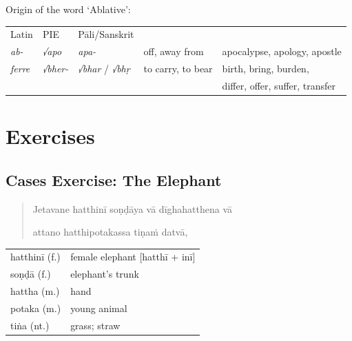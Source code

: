 \documentclass[11pt,oneside]{memoir}
\begin{document}
Origin of the word `Ablative':

\begin{center}
\begin{tabular}{lllll}
Latin & PIE & Pāli/Sanskrit &  & \\
\emph{ab-} & \emph{√apo} & \emph{apa-} & off, away from & apocalypse, apology, apostle\\
\emph{ferre} & \emph{√bher-} & \emph{√bhar} / \emph{√bhṛ} & to carry, to bear & birth, bring, burden,\\
 &  &  &  & differ, offer, suffer, transfer\\
\end{tabular}
\end{center}

\clearpage
\section{Exercises}
\label{sec:org090b430}
\subsection{Cases Exercise: The Elephant}
\label{sec:orgea3536d}

\casesLegendHeaderBGHere

\begin{quote}
Jetavane hatthinī soṇḍāya vā dīghahatthena vā

attano hatthipotakassa tiṇaṁ datvā,
\end{quote}

\bigskip

\begin{longtable}{L{\colOne} L{\colTwo}}
hatthinī (f.) & female elephant [hatthī + inī]\\
soṇḍā (f.) & elephant's trunk\\
hattha (m.) & hand\\
potaka (m.) & young animal\\
tiṅa (nt.) & grass; straw\\
\end{longtable}

\renewcommand{\arraystretch}{1.6}
\end{document}
